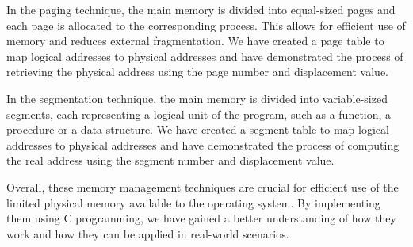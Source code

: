 \documentclass[journal,onecolumn]{IEEEtran}
\begin{document}
In the paging technique, the main memory is divided into equal-sized pages and each page is allocated to the corresponding process. This allows for efficient use of memory and reduces external fragmentation. We have created a page table to map logical addresses to physical addresses and have demonstrated the process of retrieving the physical address using the page number and displacement value.

In the segmentation technique, the main memory is divided into variable-sized segments, each representing a logical unit of the program, such as a function, a procedure or a data structure. We have created a segment table to map logical addresses to physical addresses and have demonstrated the process of computing the real address using the segment number and displacement value.

Overall, these memory management techniques are crucial for efficient use of the limited physical memory available to the operating system. By implementing them using C programming, we have gained a better understanding of how they work and how they can be applied in real-world scenarios.
\end{document}
